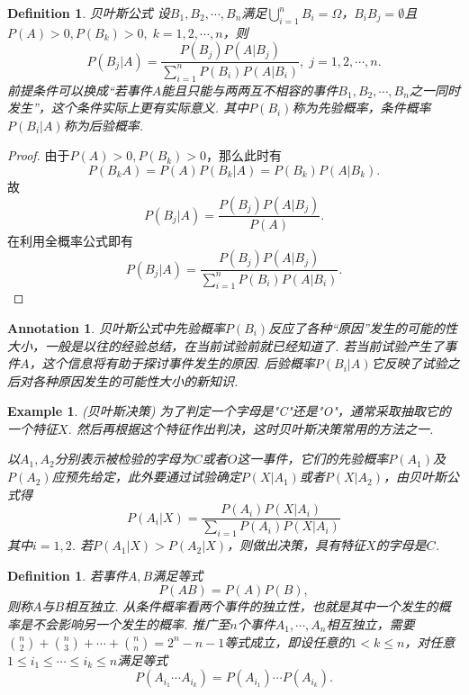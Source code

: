 \documentclass{article}
\newtheorem{example}[theorem]{Example}
\newtheorem{definition}[theorem]{Definition}
\newtheorem{annotation}[theorem]{Annotation}
\begin{document}
\begin{definition}
\rm {\color{red}贝叶斯公式} 设$B_1,B_2,\cdots,B_n$满足$\bigcup\limits_{i=1}^n B_i = \Omega$，$B_iB_j = \emptyset$且$P(A)>0, P(B_k) > 0,\; k=1,2,\cdots,n$，则
	$$
		P(B_j | A) = \frac{P(B_j)P(A|B_j)}{\sum\limits_{i=1}^n P(B_i)P(A|B_i)},\; j = 1,2,\cdots,n.
	$$
前提条件可以换成“若事件$A$能且只能与两两互不相容的事件$B_1,B_2,\cdots,B_n$之一同时发生”，这个条件实际上更有实际意义. 其中$P(B_i)$称为先验概率，条件概率$P(B_i | A)$称为后验概率. 
\end{definition}

\begin{proof}
由于$P(A) > 0,P(B_k) > 0$，那么此时有
$$
P(B_kA) = P(A)P(B_k|A) = P(B_k)P(A|B_k). 
$$
故
$$
P(B_j|A) = \frac{P(B_j)P(A|B_j)}{P(A)}.
$$
在利用全概率公式即有
$$
P(B_j|A) = \frac{P(B_j)P(A|B_j)}{\sum\limits_{i =1}^n P(B_i)P(A|B_i)}.
$$
\end{proof}

\begin{annotation}
\rm 贝叶斯公式中先验概率$P(B_i)$反应了各种“原因”发生的可能的性大小，一般是以往的经验总结，在当前试验前就已经知道了. 若当前试验产生了事件$A$，这个信息将有助于探讨事件发生的原因. 后验概率$P(B_i|A)$它反映了试验之后对各种原因发生的可能性大小的新知识.
\end{annotation}

\begin{example}
\rm {\color{red}(贝叶斯决策)} 为了判定一个字母是"C"还是"O"，通常采取抽取它的一个特征$X$. 然后再根据这个特征作出判决，这时贝叶斯决策常用的方法之一. 

以$A_1,A_2$分别表示被检验的字母为$C$或者$O$这一事件，它们的先验概率$P(A_1)$及$P(A_2)$应预先给定，此外要通过试验确定$P(X|A_1)$或者$P(X|A_2)$，由贝叶斯公式得
$$
P(A_i|X) = \frac{P(A_i)P(X|A_i)}{\sum\limits_{i=1}P(A_i)P(X|A_i)} 
$$
其中$i=1,2$. 若$P(A_1 | X) > P(A_2 | X)$，则做出决策，具有特征$X$的字母是$C$.
\end{example}

\begin{definition}
\rm 若事件$A,B$满足等式
$$
P(AB) = P(A)P(B),
$$
则称$A$与$B${\color{red}相互独立}. {\color{blue} 从条件概率看两个事件的独立性，也就是其中一个发生的概率是不会影响另一个发生的概率}. 推广至$n$个事件$A_1,\cdots,A_n$相互独立，需要$\binom n2 + \binom n3 + \cdots + \binom nn = 2^n - n -1$等式成立，即设任意的$1<k \leq n$，对任意$1 \leq i_1 \leq \cdots \leq i_k \leq n$满足等式
$$
P(A_{i_1}\cdots A_{i_k})=P(A_{i_1})\cdots P(A_{i_k}).
$$
\end{definition}
\end{document}
